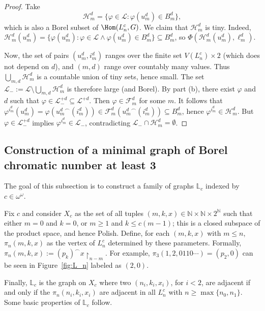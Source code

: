 \begin{proof}
    Take $$\mathcal H^d_m=\{\varphi\in\mathcal L:\varphi(u^d_m)\in B^d_m\},$$ which is also a Borel subset of $\Hom(L^c_n,G)$.
    We claim that $\mathcal H^d_m$ is tiny.
    Indeed, $\mathcal H^d_m(u^d_m)=\{\varphi(u^d_m):\varphi\in\mathcal L\land\varphi(u^d_m)\in B^d_m\}\subseteq B^d_m$, so $\Phi(\mathcal H^d_m(u^d_m),\ell^d_m)$.
    
    Now, the set of pairs $(u^d_m,i^d_m)$ ranges over the finite set $V(L^c_n)\times2$ (which does not depend on $d$), and $(m,d)$ range over countably many values.
    Thus $\bigcup_{m,d}\mathcal H^d_m$ is a countable union of tiny sets, hence small.
    The set $\mathcal L_-:=\mathcal L\setminus\bigcup_{m,d}\mathcal H^d_m$ is therefore large (and Borel).
    By part (b), there exist $\varphi$ and $d$ such that $\varphi\in\mathcal L_-^{+d}\subseteq\mathcal L^{+d}$.
    Then $\varphi\in\mathcal F^d_m$ for some $m$.
    It follows that $\varphi^{i^d_m}(u^d_m)=\varphi({u^d_m}^\smallfrown(i^d_m))\in\mathcal F^d_m({u^d_m}^\smallfrown(i^d_m))\subseteq B^d_m$, hence $\varphi^{i^d_m}\in\mathcal H^d_m$.
    But $\varphi\in\mathcal L_-^{+d}$ implies $\varphi^{i^d_m}\in\mathcal L_-$, contradicting $\mathcal L_-\cap\mathcal H^d_m=\emptyset$.
\end{proof}

\subsection{Construction of a minimal graph of Borel chromatic number at least 3}\label{sec:L0-construction}

The goal of this subsection is to construct a family of graphs $\mathbb L_c$ indexed by $c\in\omega^\omega$.

Fix $c$ and consider $X_c$ as the set of all tuples $(m,k,x)\in\mathbb N\times\mathbb N\times2^\mathbb N$ such that either $m=0$ and $k=0$, or $m\geq1$ and $k\leq c(m-1)$; this is a closed subspace of the product space, and hence Polish.
Define, for each $(m,k,x)$ with $m\leq n$, $\pi_n(m,k,x)$ as the vertex of $L^c_n$ determined by these parameters.
Formally, $\pi_n(m,k,x):=(p_k)^\smallfrown x\restriction_{n-m}$.
For example, $\pi_3(1,2,0110\cdots)=(p_2,0)$ can be seen in Figure~\ref{fig:L_n} labeled as $(2,0)$.

Finally, $\mathbb L_c$ is the graph on $X_c$ where two $(n_i,k_i,x_i)$, for $i<2$, are adjacent if and only if the $\pi_n(n_i,k_i,x_i)$ are adjacent in all $L^c_n$ with $n\geq\max\{n_0,n_1\}$.
Some basic properties of $\mathbb L_c$ follow.

